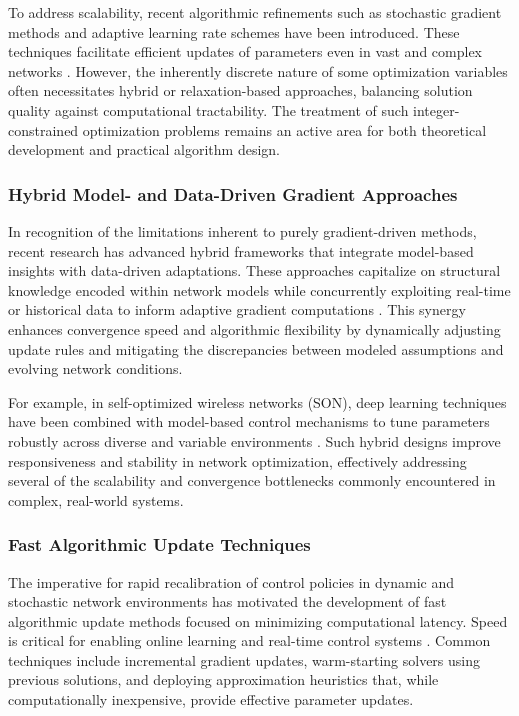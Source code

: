 \documentclass[sigconf]{acmart}
\begin{document}
To address scalability, recent algorithmic refinements such as stochastic gradient methods and adaptive learning rate schemes have been introduced. These techniques facilitate efficient updates of parameters even in vast and complex networks \cite{ref1,ref9,ref10,ref11,ref12,ref14,ref16}. However, the inherently discrete nature of some optimization variables often necessitates hybrid or relaxation-based approaches, balancing solution quality against computational tractability. The treatment of such integer-constrained optimization problems remains an active area for both theoretical development and practical algorithm design.

\subsubsection{Hybrid Model- and Data-Driven Gradient Approaches}

In recognition of the limitations inherent to purely gradient-driven methods, recent research has advanced hybrid frameworks that integrate model-based insights with data-driven adaptations. These approaches capitalize on structural knowledge encoded within network models while concurrently exploiting real-time or historical data to inform adaptive gradient computations \cite{ref5,ref7,ref13}. This synergy enhances convergence speed and algorithmic flexibility by dynamically adjusting update rules and mitigating the discrepancies between modeled assumptions and evolving network conditions.

For example, in self-optimized wireless networks (SON), deep learning techniques have been combined with model-based control mechanisms to tune parameters robustly across diverse and variable environments \cite{ref1}. Such hybrid designs improve responsiveness and stability in network optimization, effectively addressing several of the scalability and convergence bottlenecks commonly encountered in complex, real-world systems.

\subsubsection{Fast Algorithmic Update Techniques}

The imperative for rapid recalibration of control policies in dynamic and stochastic network environments has motivated the development of fast algorithmic update methods focused on minimizing computational latency. Speed is critical for enabling online learning and real-time control systems \cite{ref2,ref3,ref6,ref8,ref9,ref11,ref15,ref16}. Common techniques include incremental gradient updates, warm-starting solvers using previous solutions, and deploying approximation heuristics that, while computationally inexpensive, provide effective parameter updates.
\end{document}
